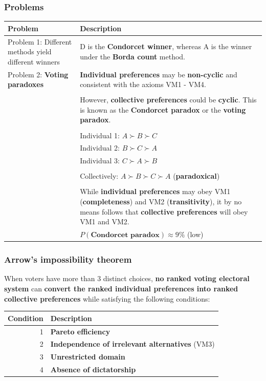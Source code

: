 \documentclass[11pt]{article}
\begin{document}
\subsubsection{Problems}
\label{sec:org5d5c5e5}
\begin{center}
\begin{tabular}{|m{8em}|m{25em}|}
\hline
Problem & Description\\
\hline
Problem 1: Different methods yield different winners & D is the \textbf{Condorcet winner}, whereas A is the winner under the \textbf{Borda count} method.\\
\hline
Problem 2: \textbf{Voting paradoxes} & \textbf{Individual preferences} may be \textbf{non-cyclic} and consistent with the axioms VM1 - VM4.\\
 & \\
 & However, \textbf{collective preferences} could be \textbf{cyclic}. This is known as the \textbf{Condorcet paradox} or the \textbf{voting paradox}.\\
 & \\
 & Individual 1: \(A \succ B \succ C\)\\
 & Individual 2: \(B \succ C \succ A\)\\
 & Individual 3: \(C \succ A \succ B\)\\
 & \\
 & Collectively: \(A \succ B \succ C \succ A\) (\textbf{paradoxical})\\
 & \\
 & While \textbf{individual preferences} may obey VM1 (\textbf{completeness}) and VM2 (\textbf{transitivity}), it by no means follows that \textbf{collective preferences} will obey VM1 and VM2.\\
 & \(P(\textbf{Condorcet paradox}) \approx 9\%\) (low)\\
\hline
\end{tabular}
\end{center}
\subsubsection{Arrow's impossibility theorem}
\label{sec:org915f2a9}
When voters have more than 3 distinct choices, \textbf{no ranked voting electoral system} can \textbf{convert the ranked individual preferences into ranked collective preferences} while satisfying the following conditions:
\begin{center}
\begin{tabular}{r|l}
Condition & Description\\
\hline
1 & \textbf{Pareto efficiency}\\
2 & \textbf{Independence of irrelevant alternatives} (VM3)\\
3 & \textbf{Unrestricted domain}\\
4 & \textbf{Absence of dictatorship}\\
\end{tabular}
\end{center}
\end{document}
